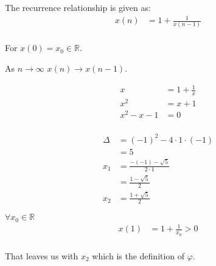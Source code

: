 \documentclass{article}
\begin{document}
The recurrence relationship is given as:
\[
	\begin{aligned}
		x(n)  & = 1 + \frac{1}{x(n - 1)} \\
	\end{aligned}
\]

For $x(0) = x_0 \in \mathbb{R}$.

As $n \rightarrow \infty$ $x(n)\rightarrow x(n - 1)$.

\[
	\begin{aligned}
		x &= 1 + \frac{1}{x} \\
		x^2 &= x + 1 \\
		x^2 - x - 1 &= 0 \\
	\end{aligned}
\]

\[
	\begin{aligned}
		\Delta &= (-1)^2 - 4 \cdot 1 \cdot (-1) \\
				 &= 5 \\
		x_1 &= \frac{- (-1) - \sqrt{5}}{2 \cdot 1} \\
		    &= \frac{1 - \sqrt{5}}{2} \\
		x_2 &= \frac{1 + \sqrt{5}}{2}
	\end{aligned}
\]


$\forall x_0 \in \mathbb{R} $
\[
	\begin{aligned}
		x(1) & = 1 + \frac{1}{x_0} > 0\\
	\end{aligned}
\]

That leaves us with $x_2$ which is the definition of $\varphi$.
\end{document}
